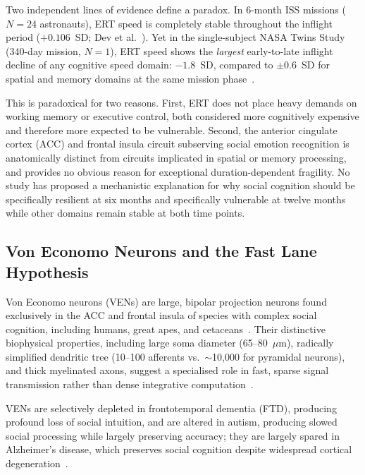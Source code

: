 \documentclass[11pt]{article}
\begin{document}
Two independent lines of evidence define a paradox.
In 6-month ISS missions ($N=24$ astronauts), ERT speed is completely stable
throughout the inflight period ($+0.106$~SD; Dev et al.~\cite{dev2024}).
Yet in the single-subject NASA Twins Study (340-day mission, $N=1$),
ERT speed shows the \emph{largest} early-to-late inflight decline of any
cognitive speed domain: $-1.8$~SD, compared to $\pm 0.6$~SD for spatial
and memory domains at the same mission phase~\cite{garrett2019}.

This is paradoxical for two reasons.
First, ERT does not place heavy demands on working memory or executive
control, both considered more cognitively expensive and therefore more
expected to be vulnerable.
Second, the anterior cingulate cortex (ACC) and frontal insula circuit
subserving social emotion recognition is anatomically distinct from
circuits implicated in spatial or memory processing, and provides no
obvious reason for exceptional duration-dependent fragility.
No study has proposed a mechanistic explanation for why social cognition
should be specifically resilient at six months and specifically vulnerable
at twelve months while other domains remain stable at both time points.

\subsection{Von Economo Neurons and the Fast Lane Hypothesis}

Von Economo neurons (VENs) are large, bipolar projection neurons found
exclusively in the ACC and frontal insula of species with complex social
cognition, including humans, great apes, and cetaceans~\cite{allman2010}.
Their distinctive biophysical properties, including large soma diameter
(65--80~$\mu$m), radically simplified dendritic tree (10--100 afferents
vs.\ $\sim$10,000 for pyramidal neurons), and thick myelinated axons,
suggest a specialised role in fast, sparse signal transmission rather than
dense integrative computation~\cite{allman2010,butti2013}.

VENs are selectively depleted in frontotemporal dementia (FTD), producing
profound loss of social intuition, and are altered in autism, producing
slowed social processing while largely preserving accuracy; they are
largely spared in Alzheimer's disease, which preserves social cognition
despite widespread cortical degeneration~\cite{seeley2006,stimpson2011}.
\end{document}
